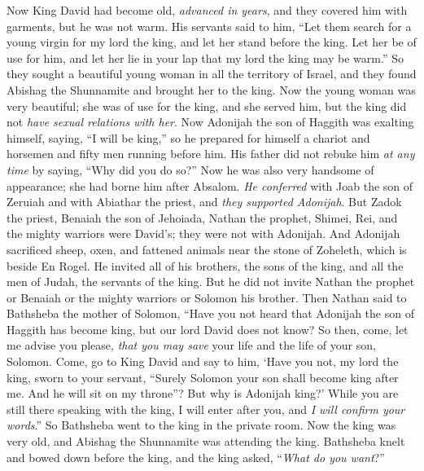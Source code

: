 
\begin{biblechapter} %
 Now King David had become old, \textit{advanced in years}, and they covered him with garments, but he was not warm.
\verse His servants said to him, “Let them search for a young virgin for my lord the king, and let her stand before the king. Let her be of use for him, and let her lie in your lap that my lord the king may be warm.”
\verse So they sought a beautiful young woman in all the territory of Israel, and they found Abishag the Shunnamite and brought her to the king.
\verse Now the young woman was very beautiful; she was of use for the king, and she served him, but the king did not \textit{have sexual relations with her}.
 Now Adonijah the son of Haggith was exalting himself, saying, “I will be king,” so he prepared for himself a chariot and horsemen and fifty men running before him.
\verse His father did not rebuke him \textit{at any time} by saying, “Why did you do so?” Now he was also very handsome of appearance; she had borne him after Absalom.
\verse \textit{He conferred} with Joab the son of Zeruiah and with Abiathar the priest, and \textit{they supported Adonijah}.
\verse But Zadok the priest, Benaiah the son of Jehoiada, Nathan the prophet, Shimei, Rei, and the mighty warriors were David’s; they were not with Adonijah.
\verse And Adonijah sacrificed sheep, oxen, and fattened animals near the stone of Zoheleth, which is beside En Rogel. He invited all of his brothers, the sons of the king, and all the men of Judah, the servants of the king.
\verse But he did not invite Nathan the prophet or Benaiah or the mighty warriors or Solomon his brother.
 Then Nathan said to Bathsheba the mother of Solomon, “Have you not heard that Adonijah the son of Haggith has become king, but our lord David does not know?
\verse So then, come, let me advise you please, \textit{that you may save} your life and the life of your son, Solomon.
\verse Come, go to King David and say to him, ‘Have you not, my lord the king, sworn to your servant, “Surely Solomon your son shall become king after me. And he will sit on my throne”? But why is Adonijah king?’
\verse While you are still there speaking with the king, I will enter after you, and \textit{I will confirm your words}.”
\verse So Bathsheba went to the king in the private room. Now the king was very old, and Abishag the Shunnamite was attending the king.
\verse Bathsheba knelt and bowed down before the king, and the king asked, “\textit{What do you want}?”

\end{biblechapter}
